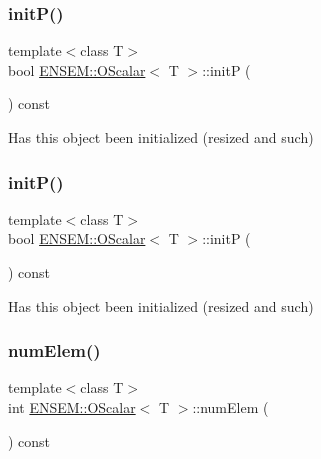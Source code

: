 \mbox{\label{classENSEM_1_1OScalar_a2de94d9cb377fa4ca961d0a8906a76b6}} 
\subsubsection{\texorpdfstring{initP()}{initP()}\hspace{0.1cm}{\footnotesize\ttfamily [1/2]}}
{\footnotesize\ttfamily template$<$class T$>$ \\
bool \mbox{\hyperlink{classENSEM_1_1OScalar}{E\+N\+S\+E\+M\+::\+O\+Scalar}}$<$ T $>$\+::initP (\begin{DoxyParamCaption}{ }\end{DoxyParamCaption}) const\hspace{0.3cm}{\ttfamily [inline]}}



Has this object been initialized (resized and such) 

\mbox{\label{classENSEM_1_1OScalar_a2de94d9cb377fa4ca961d0a8906a76b6}} 
\subsubsection{\texorpdfstring{initP()}{initP()}\hspace{0.1cm}{\footnotesize\ttfamily [2/2]}}
{\footnotesize\ttfamily template$<$class T$>$ \\
bool \mbox{\hyperlink{classENSEM_1_1OScalar}{E\+N\+S\+E\+M\+::\+O\+Scalar}}$<$ T $>$\+::initP (\begin{DoxyParamCaption}{ }\end{DoxyParamCaption}) const\hspace{0.3cm}{\ttfamily [inline]}}



Has this object been initialized (resized and such) 

\mbox{\label{classENSEM_1_1OScalar_aa9a7a2cddc34ba1add28369a764ced80}} 
\subsubsection{\texorpdfstring{numElem()}{numElem()}\hspace{0.1cm}{\footnotesize\ttfamily [1/2]}}
{\footnotesize\ttfamily template$<$class T$>$ \\
int \mbox{\hyperlink{classENSEM_1_1OScalar}{E\+N\+S\+E\+M\+::\+O\+Scalar}}$<$ T $>$\+::num\+Elem (\begin{DoxyParamCaption}{ }\end{DoxyParamCaption}) const\hspace{0.3cm}{\ttfamily [inline]}}

